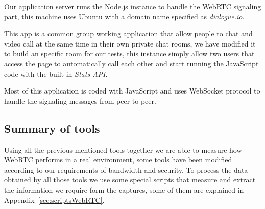 Our application server runs the Node.js instance to handle the WebRTC signaling part, this machine uses Ubuntu with a domain name specified as {\it dialogue.io}. 

This app is a common group working application that allow people to chat and video call at the same time in their own private chat rooms, we have modified it to build an specific room for our tests, this instance simply allow two users that access the page to automatically call each other and start running the JavaScript code with the built-in {\it Stats API}.

Most of this application is coded with JavaScript and uses WebSocket protocol to handle the signaling messages from peer to peer.

\subsection{Summary of tools}

Using all the previous mentioned tools together we are able to measure how WebRTC performs in a real environment, some tools have been modified according to our requirements of bandwidth and security. To process the data obtained by all those tools we use some special scripts that measure and extract the information we require form the captures, some of them are explained in Appendix~\ref{sec:scriptsWebRTC}.